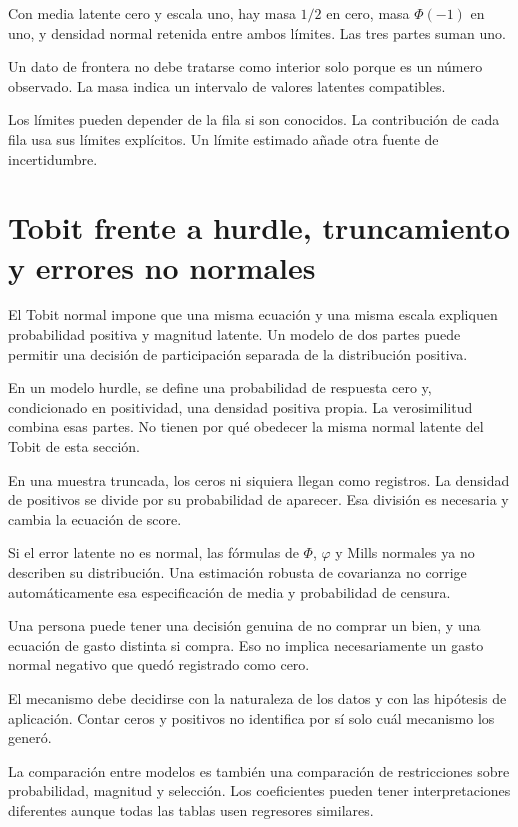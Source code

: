 \documentclass[11pt,a4paper]{article}
\begin{document}
\begin{ejemplo}
Con media latente cero y escala uno,
hay masa \(1/2\) en cero,
masa \(\Phi(-1)\) en uno,
y densidad normal retenida
entre ambos límites.
Las tres partes suman uno.
\end{ejemplo}
Un dato de frontera no debe
tratarse como interior solo
porque es un número observado.
La masa indica un intervalo
de valores latentes compatibles.

Los límites pueden depender de
la fila si son conocidos.
La contribución de cada fila
usa sus límites explícitos.
Un límite estimado añade
otra fuente de incertidumbre.

\clearpage
\section{Tobit frente a hurdle, truncamiento y errores no normales}\label{unidad104}
El Tobit normal impone que
una misma ecuación y una
misma escala expliquen
probabilidad positiva y magnitud latente.
Un modelo de dos partes puede
permitir una decisión de participación
separada de la distribución positiva.

En un modelo hurdle, se define
una probabilidad de respuesta cero
y, condicionado en positividad,
una densidad positiva propia.
La verosimilitud combina esas partes.
No tienen por qué obedecer
la misma normal latente
del Tobit de esta sección.

En una muestra truncada, los ceros
ni siquiera llegan como registros.
La densidad de positivos se
divide por su probabilidad
de aparecer. Esa división
es necesaria y cambia
la ecuación de score.

Si el error latente no es normal,
las fórmulas de \(\Phi\),
\(\varphi\) y Mills normales
ya no describen su distribución.
Una estimación robusta de
covarianza no corrige automáticamente
esa especificación de media
y probabilidad de censura.

\begin{ejemplo}
Una persona puede tener
una decisión genuina de
no comprar un bien,
y una ecuación de gasto
distinta si compra.
Eso no implica necesariamente
un gasto normal negativo
que quedó registrado como cero.
\end{ejemplo}
El mecanismo debe decidirse
con la naturaleza de los datos
y con las hipótesis de aplicación.
Contar ceros y positivos
no identifica por sí solo
cuál mecanismo los generó.

La comparación entre modelos
es también una comparación
de restricciones sobre probabilidad,
magnitud y selección.
Los coeficientes pueden
tener interpretaciones diferentes
aunque todas las tablas
usen regresores similares.
\end{document}
